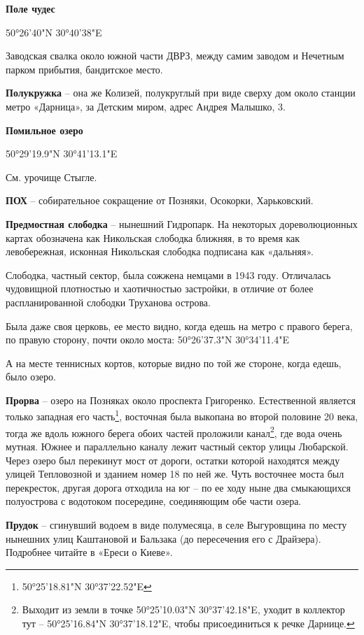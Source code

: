 \medskip


\textbf{Поле чудес}

50°26'40"N 30°40'38"E

Заводская свалка около южной части ДВРЗ, между самим заводом и Нечетным парком прибытия, бандитское место.\\

\medskip


\textbf{Полукружка} – она же Колизей, полукруглый при виде сверху дом около станции метро «Дарница», за Детским миром, адрес Андрея Малышко, 3.\\

\medskip


\textbf{Помильное озеро}

50°29'19.9"N 30°41'13.1"E

См. урочище Стыгле.\\

\medskip


\textbf{ПОХ} – собирательное сокращение от Позняки, Осокорки, Харьковский.\\

\medskip


\textbf{Предмостная слободка} – нынешний Гидропарк. На некоторых дореволюционных картах обозначена как Никольская слободка ближняя, в то время как левобережная, исконная Никольская слободка подписана как «дальняя».

Слободка, частный сектор, была сожжена немцами в 1943 году. Отличалась чудовищной плотностью и хаотичностью застройки, в отличие от более распланированной слободки Труханова острова. 

Была даже своя церковь, ее место видно, когда едешь на метро с правого берега, по правую сторону, почти около моста: 50°26'37.3"N 30°34'11.4"E

А на месте теннисных кортов, которые видно по той же стороне, когда едешь, было озеро.\\

\medskip


\textbf{Прорва} – озеро на Позняках около проспекта Григоренко. Естественной является только западная его часть\footnote{50°25'18.81"N 30°37'22.52"E}, восточная была выкопана во второй половине 20 века, тогда же вдоль южного берега обоих частей проложили канал\footnote{Выходит из земли в точке 50°25'10.03"N 30°37'42.18"E, уходит в коллектор тут – 50°25'16.84"N 30°37'18.12"E, чтобы присоединиться к речке Дарнице.}, где вода очень мутная. Южнее и параллельно каналу лежит частный сектор улицы Любарской. Через озеро был перекинут мост от дороги, остатки которой находятся между улицей Тепловозной и зданием номер 18 по ней же. Чуть восточнее моста был перекресток, другая дорога отходила на юг – по ее ходу ныне два смыкающихся полуострова с водотоком посередине, соединяющим обе части озера.\\

\medskip


\textbf{Прудок} – сгинувший водоем в виде полумесяца, в селе Выгуровщина по месту нынешних улиц Каштановой и Бальзака (до пересечения его с Драйзера). Подробнее читайте в «Ереси о Киеве».